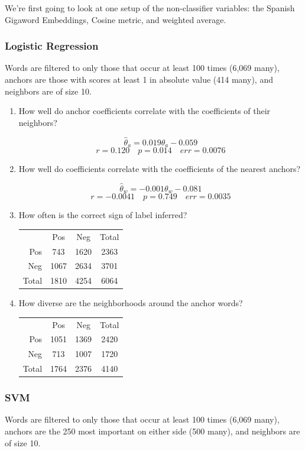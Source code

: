 \documentclass[11pt]{article} %
\begin{document}
We're first going to look at one setup of the non-classifier variables: the Spanish Gigaword Embeddings, Cosine metric, and weighted average.

\subsubsection{Logistic Regression}
Words are filtered to only those that occur at least 100 times (6,069 many), anchors are those with scores at least 1 in absolute value (414 many), and neighbors are of size 10. 

\begin{enumerate}
\item How well do anchor coefficients correlate with the coefficients of their neighbors?

\[ \hat{\theta}_a = 0.019 \theta_a - 0.059 \]
\[ r = 0.120 \quad p = 0.014 \quad err = 0.0076 \]


\item How well do coefficients correlate with the coefficients of the nearest anchors?

\[ \hat{\theta}_w = -0.001 \theta_w - 0.081 \]
\[ r = -0.0041 \quad p = 0.749 \quad err = 0.0035 \]


\item How often is the correct sign of label inferred?

\begin{center}
\begin{tabular}{r|c|c|c}
& Pos & Neg & Total \\
Pos & 743 & 1620 & 2363 \\
Neg & 1067 & 2634 & 3701 \\
Total & 1810 & 4254 & 6064 
\end{tabular}
\end{center}

\item How diverse are the neighborhoods around the anchor words?
\begin{center}
\begin{tabular}{r|c|c|c}
& Pos & Neg & Total \\
Pos & 1051 & 1369 & 2420 \\
Neg & 713 & 1007 & 1720 \\
Total & 1764 & 2376 & 4140 
\end{tabular}
\end{center}
\end{enumerate}


\subsubsection{SVM}
Words are filtered to only those that occur at least 100 times (6,069 many), anchors are the 250 most important on either side (500 many), and neighbors are of size 10. 
\end{document}
